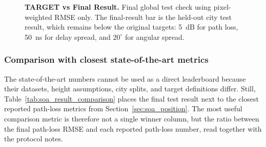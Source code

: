 \begin{figure}[H]
\begin{minipage}{0.31\textwidth}
\end{minipage}
\caption[Final result against original numerical targets.]%
{\textbf{TARGET vs Final Result.} Final global test check using
pixel-weighted RMSE only. The final-result bar is the held-out city test result,
which remains below the original targets: \SI{5}{dB} for path loss, \SI{50}{ns}
for delay spread, and \(20^\circ\) for angular spread.}
\label{fig:try80_test_objectives}
\end{figure}

\subsubsection*{Comparison with closest state-of-the-art metrics}

The state-of-the-art numbers cannot be used as a direct leaderboard because
their datasets, height assumptions, city splits, and target definitions differ.
Still, Table~\ref{tab:soa_result_comparison} places the final test result next
to the closest reported path-loss metrics from Section~\ref{sec:soa_position}.
The most useful comparison metric is therefore not a single winner column, but
the ratio between the final path-loss RMSE and each reported path-loss number,
read together with the protocol notes.

